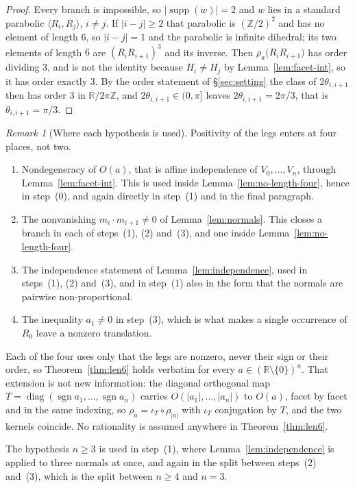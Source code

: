 \documentclass[11pt,a4paper]{article}
\newcommand{\Z}{\mathbb{Z}}
\newcommand{\R}{\mathbb{R}}
\theoremstyle{definition}
\theoremstyle{remark}
\newtheorem{remark}[theorem]{Remark}
\theoremstyle{plain}
\begin{document}
\begin{proof}
Every branch is impossible, so $|\operatorname{supp}(w)|=2$ and $w$ lies in a standard
parabolic $\langle R_i,R_j\rangle$, $i\ne j$. If $|i-j|\ge2$ that parabolic is
$(\Z/2)^2$ and has no element of length $6$, so $|i-j|=1$ and the parabolic is infinite
dihedral; its two elements of length $6$ are $(R_iR_{i+1})^{3}$ and its inverse. Then
$\rho_a\bigl(R_iR_{i+1}\bigr)$ has order dividing $3$, and is not the identity because
$H_i\ne H_j$ by Lemma~\ref{lem:facet-int}, so it has order exactly $3$. By the order statement
of \S\ref{sec:setting} the class of $2\theta_{i,i+1}$ then has order $3$ in $\R/2\pi\Z$, and
$2\theta_{i,i+1}\in(0,\pi]$ leaves $2\theta_{i,i+1}=2\pi/3$, that is $\theta_{i,i+1}=\pi/3$.
\end{proof}

\begin{remark}[Where each hypothesis is used]\label{rem:len6-hyp}
Positivity of the legs enters at four places, not two.
\begin{enumerate}[label=(\alph*),leftmargin=2.2em,itemsep=0.2em]
\item Nondegeneracy of $O(a)$, that is affine independence of $V_0,\dots,V_n$, through
Lemma~\ref{lem:facet-int}. This is used inside Lemma~\ref{lem:no-length-four}, hence in
step~(0), and again directly in step~(1) and in the final paragraph.
\item The nonvanishing $m_i\cdot m_{i+1}\ne0$ of Lemma~\ref{lem:normals}. This closes a branch
in each of steps~(1), (2) and~(3), and one inside Lemma~\ref{lem:no-length-four}.
\item The independence statement of Lemma~\ref{lem:independence}, used in steps~(1), (2)
and~(3), and in step~(1) also in the form that the normals are pairwise non-proportional.
\item The inequality $a_1\ne0$ in step~(3), which is what makes a single occurrence of $R_0$
leave a nonzero translation.
\end{enumerate}
Each of the four uses only that the legs are nonzero, never their sign or their order, so
Theorem~\ref{thm:len6} holds verbatim for every $a\in(\R\setminus\{0\})^n$. That extension is
not new information: the diagonal orthogonal map
$T=\operatorname{diag}(\operatorname{sgn}a_1,\dots,\operatorname{sgn}a_n)$ carries
$O(|a_1|,\dots,|a_n|)$ to $O(a)$, facet by facet and in the same indexing, so
$\rho_a=\iota_T\circ\rho_{|a|}$ with $\iota_T$ conjugation by $T$, and the two kernels
coincide. No rationality is assumed anywhere in Theorem~\ref{thm:len6}.

The hypothesis $n\ge3$ is used in step~(1), where Lemma~\ref{lem:independence} is applied to
three normals at once, and again in the split between steps~(2) and~(3), which is the split
between $n\ge4$ and $n=3$.
\end{remark}
\end{document}
